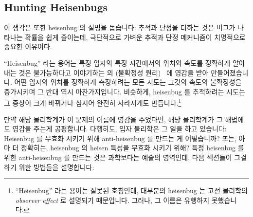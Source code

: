 \fi

\subsection{Hunting Heisenbugs}
\label{sec:debugging:Hunting Heisenbugs}

이 생각은 또한 heisenbug 의 설명을 돕습니다:
추적과 단정을 더하는 것은 버그가 나타나는 확률을 쉽게 줄이는데, 극단적으로
가벼운 추적과 단정 메커니즘이 치명적으로 중요한 이유이다.

``Heisenbug'' 라는 용어는 특정 입자의 특정 시간에서의 위치와 속도를 정확하게
알아내는 것은 불가능하다고 이야기하는  의
 (불확정성 원리)~\cite{WeinerHeisenberg1927Uncertain}
에 영감을 받아 만들어졌습니다.
어떤 입자의 위치를 정확하게 측정하려는 모든 시도는 그것의 속도의 불확정성을
증가시키며 그 반대 역시 마찬가지입니다.
비슷하게, heisenbug 를 추적하려는 시도는 그 증상이 크게 바뀌거나 심지어 완전히
사라지게도 만듭니다.\footnote{
	``Heisenbug'' 라는 용어는 잘못된 호칭인데, 대부분의 heisenbug 는 고전
	물리학의 \emph{observer effect} 로 설명되기 때문입니다.
	그러나, 그 이름은 유행하지 못했습니다.}

만약 해당 물리학계가 이 문제의 이름에 영감을 주었다면, 해당 물리학계가 그
해법에도 영감을 주는게 공평합니다.
다행히도, 입자 물리학은 그 일을 하고 있습니다:
Heisenbug 를 무효화 시키기 위해 anti-heisenbug 를 만드는 게 어떻습니까?
또는, 아마 더 정확히는, heisenbug 의 heisen 특성을 무효화 시키기 위해?
특정 heisenbug 를 위한 anti-heisenbug 를 만드는 것은 과학보다는 예술의
영역인데, 다음 섹션들이 그걸 하기 위한 방법들을 설명합니다:

